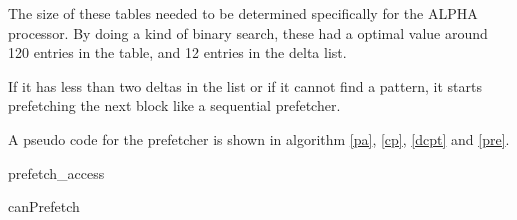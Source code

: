 \documentclass[12pt,journal,compsoc]{IEEEtran}
\begin{document}
The size of these tables needed to be determined specifically for the ALPHA processor. By doing a kind of binary search, these had a optimal value around 120 entries in the table, and 12 entries in the delta list.

If it has less than two deltas in the list or if it cannot find a pattern, it starts prefetching the next block like a sequential prefetcher.

A pseudo code for the prefetcher is shown in algorithm \ref{pa}, \ref{cp}, \ref{dcpt} and \ref{pre}.

\begin{comment}
\subsection{Attempts to tweak this implementation}
\begin{itemize}
\item Make a copy of the queue to keep track of which addresses that still are
not fetched, to avoid "double fetching".
\item Make a LRU which prevents the prefetcher from throwing out recently used history from the list.
\item Adjustments to the size of the list, and size of the delta list
\end{itemize}
\end{comment}

\begin{algorithm}
\dontprintsemicolon
{}

\caption{prefetch\_access\label{pa}}
\end{algorithm}

\begin{algorithm}
\dontprintsemicolon
{}

\caption{canPrefetch\label{cp}}
\end{algorithm}
\end{document}
